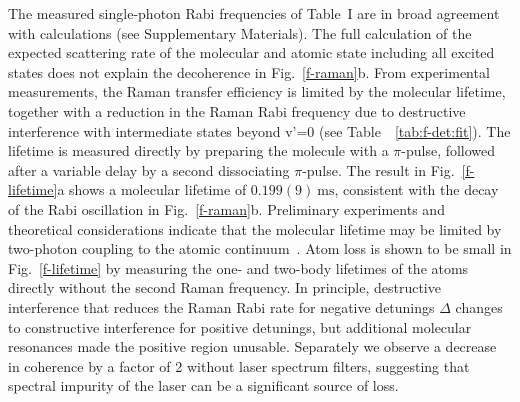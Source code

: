 \documentclass[aps,prl,twocolumn,10pt,superscriptaddress]{revtex4-1}
\newcommand{\todo}[1]{}
\newcounter{TRC}
\newcommand{\TR}[1]{\textcolor{violet}{[[\stepcounter{TRC} TR\arabic{TRC}: #1]]}}
\begin{document}
The measured single-photon Rabi frequencies of Table~I are in broad agreement with calculations (see Supplementary Materials). 
The full calculation of the expected scattering rate of the molecular and atomic state including all excited states does not explain the decoherence in Fig.~\ref{f-raman}b. 
From experimental measurements, the Raman transfer efficiency is limited by the molecular lifetime, together with a reduction in the Raman Rabi frequency due to destructive interference with intermediate states beyond v'=0 (see Table~~\ref{tab:f-det:fit}).
The lifetime is measured directly by preparing the molecule with a $\pi$-pulse,
followed after a variable delay by a second dissociating $\pi$-pulse.
The result in Fig.~\ref{f-lifetime}a shows a molecular lifetime of $0.199(9)~\mathrm{ms}$,
consistent with the decay of the Rabi oscillation in Fig.~\ref{f-raman}b.
Preliminary experiments and theoretical considerations indicate that the molecular lifetime may be limited by two-photon coupling to the atomic continuum~\cite{YichaoYu}.  Atom loss is shown to be small in Fig.~\ref{f-lifetime} by measuring the one- and
two-body lifetimes of the atoms directly without the second Raman frequency.  In principle, destructive interference that reduces the Raman Rabi rate for negative detunings $\Delta$ changes to constructive interference for positive detunings, but additional molecular resonances made the positive region unusable.  Separately we observe a decrease in coherence by a factor of 2 without laser spectrum filters,
suggesting that spectral impurity of the laser can be a significant source of loss.
\end{document}
